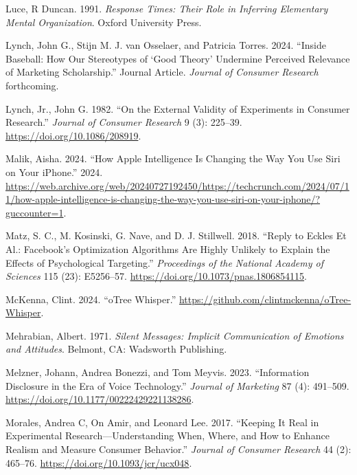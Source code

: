 \documentclass[
  a4paper,
]{scrreprt}
\newlength{\cslhangindent}
\newlength{\cslentryspacingunit} %
\newenvironment{CSLReferences}[2] %
 {%
  \setlength{\parindent}{0pt}
  \ifodd #1
  \let\oldpar\par
  \def\par{\hangindent=\cslhangindent\oldpar}
  \fi
  \setlength{\parskip}{#2\cslentryspacingunit}
 }%
 {}
\begin{document}
\begin{CSLReferences}{1}{0}
\leavevmode{}%
Luce, R Duncan. 1991. \emph{Response Times: Their Role in Inferring
Elementary Mental Organization}. Oxford University Press.

\leavevmode{}%
Lynch, John G., Stijn M. J. van Osselaer, and Patricia Torres. 2024.
{``Inside Baseball: How Our Stereotypes of {`Good Theory'} Undermine
Perceived Relevance of Marketing Scholarship.''} Journal Article.
\emph{Journal of Consumer Research} forthcoming.

\leavevmode{}%
Lynch, Jr., John G. 1982. {``{On the External Validity of Experiments in
Consumer Research}.''} \emph{Journal of Consumer Research} 9 (3):
225--39. \url{https://doi.org/10.1086/208919}.

\leavevmode{}%
Malik, Aisha. 2024. {``How Apple Intelligence Is Changing the Way You
Use Siri on Your iPhone.''} 2024.
\url{https://web.archive.org/web/20240727192450/https://techcrunch.com/2024/07/11/how-apple-intelligence-is-changing-the-way-you-use-siri-on-your-iphone/?guccounter=1}.

\leavevmode{}%
Matz, S. C., M. Kosinski, G. Nave, and D. J. Stillwell. 2018. {``Reply
to Eckles Et Al.: Facebook's Optimization Algorithms Are Highly Unlikely
to Explain the Effects of Psychological Targeting.''} \emph{Proceedings
of the National Academy of Sciences} 115 (23): E5256--57.
\url{https://doi.org/10.1073/pnas.1806854115}.

\leavevmode{}%
McKenna, Clint. 2024. {``{oTree Whisper}.''}
\url{https://github.com/clintmckenna/oTree-Whisper}.

\leavevmode{}%
Mehrabian, Albert. 1971. \emph{Silent Messages: Implicit Communication
of Emotions and Attitudes}. Belmont, CA: Wadsworth Publishing.

\leavevmode{}%
Melzner, Johann, Andrea Bonezzi, and Tom Meyvis. 2023. {``Information
Disclosure in the Era of Voice Technology.''} \emph{Journal of
Marketing} 87 (4): 491--509.
\url{https://doi.org/10.1177/00222429221138286}.

\leavevmode{}%
Morales, Andrea C, On Amir, and Leonard Lee. 2017. {``{Keeping It Real
in Experimental Research---Understanding When, Where, and How to Enhance
Realism and Measure Consumer Behavior}.''} \emph{Journal of Consumer
Research} 44 (2): 465--76. \url{https://doi.org/10.1093/jcr/ucx048}.


\end{CSLReferences}
\end{document}
